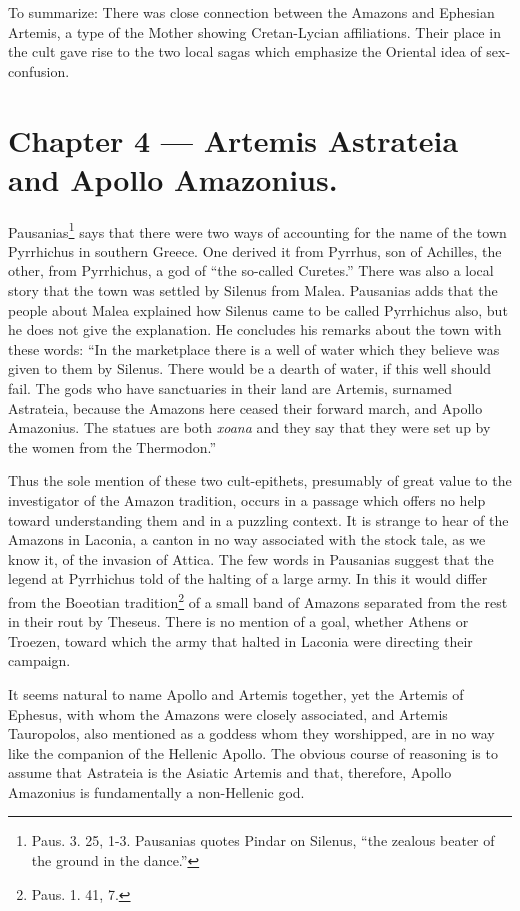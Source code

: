 \documentclass[a4paper, 12pt, oneside]{article}
\begin{document}
To summarize: There was close connection between the Amazons and Ephesian Artemis, a type of the Mother showing Cretan-Lycian affiliations. Their place in the cult gave rise to the two local sagas which emphasize the Oriental idea of sex-confusion.
\clearpage
\section{Chapter 4 --- Artemis Astrateia and Apollo Amazonius.}
\paragraph{}
Pausanias\footnote{Paus. 3. 25, 1-3. Pausanias quotes Pindar on Silenus, ``the zealous beater of the ground in the dance.''} says that there were two ways of accounting for the name of the town Pyrrhichus in southern Greece. One derived it from Pyrrhus, son of Achilles, the other, from Pyrrhichus, a god of ``the so-called Curetes.'' There was also a local story that the town was settled by Silenus from Malea. Pausanias adds that the people about Malea explained how Silenus came to be called Pyrrhichus also, but he does not give the explanation. He concludes his remarks about the town with these words: ``In the marketplace there is a well of water which they believe was given to them by Silenus. There would be a dearth of water, if this well should fail. The gods who have sanctuaries in their land are Artemis, surnamed Astrateia, because the Amazons here ceased their forward march, and Apollo Amazonius. The statues are both \emph{xoana} and they say that they were set up by the women from the Thermodon.''

Thus the sole mention of these two cult-epithets, presumably of great value to the investigator of the Amazon tradition, occurs in a passage which offers no help toward understanding them and in a puzzling context. It is strange to hear of the Amazons in Laconia, a canton in no way associated with the stock tale, as we know it, of the invasion of Attica. The few words in Pausanias suggest that the legend at Pyrrhichus told of the halting of a large army. In this it would differ from the Boeotian tradition\footnote{Paus. 1. 41, 7.} of a small band of Amazons separated from the rest in their rout by Theseus. There is no mention of a goal, whether Athens or Troezen, toward which the army that halted in Laconia were directing their campaign.

It seems natural to name Apollo and Artemis together, yet the Artemis of Ephesus, with whom the Amazons were closely associated, and Artemis Tauropolos, also mentioned as a goddess whom they worshipped, are in no way like the companion of the Hellenic Apollo. The obvious course of reasoning is to assume that Astrateia is the Asiatic Artemis and that, therefore, Apollo Amazonius is fundamentally a non-Hellenic god.
\end{document}
